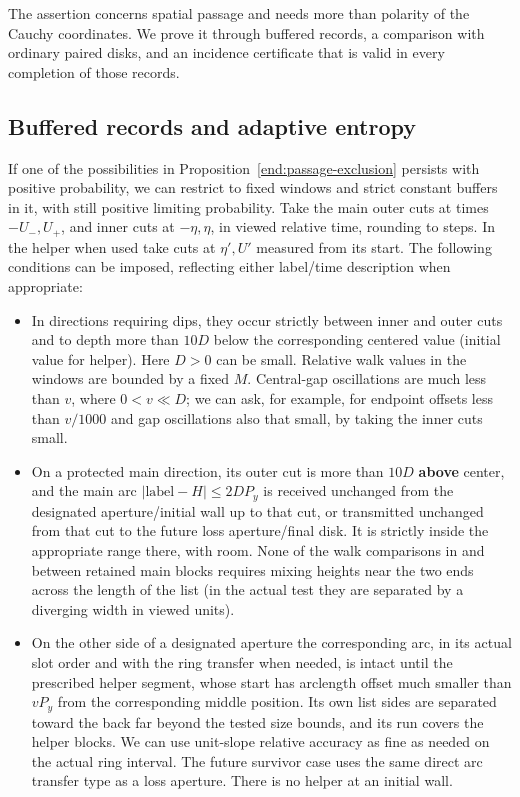 The assertion concerns spatial passage and needs more than polarity of the
Cauchy coordinates. We prove it through buffered records, a comparison with
ordinary paired disks, and an incidence certificate that is valid in every
completion of those records.

\subsection{Buffered records and adaptive entropy}

If one of the possibilities in Proposition~\ref{end:passage-exclusion}
persists with positive probability, we can restrict to fixed windows and strict constant
buffers in it, with still positive limiting probability. Take the main outer cuts at times
\(-U_-,U_+\), and inner cuts at \(-\eta,\eta\), in viewed relative time, rounding to
steps. In the helper when used take cuts at \(\eta',U'\) measured from its start. The
following conditions can be imposed, reflecting either label/time description when
appropriate:

\begin{itemize}
\item
  In directions requiring dips, they occur strictly between inner and outer cuts and to
  depth more than \(10D\) below the corresponding centered value (initial value for
  helper). Here \(D>0\) can be small. Relative walk values in the windows are bounded by a
  fixed \(M\). Central-gap oscillations are much less than \(v\), where \(0<v\ll D\); we
  can ask, for example, for endpoint offsets less than \(v/1000\) and gap oscillations
  also that small, by taking the inner cuts small.
\item
  On a protected main direction, its outer cut is more than \(10D\) \textbf{above} center,
  and the main arc \(|\text{label}-H|\le 2D P_y\) is received unchanged from the
  designated aperture/initial wall up to that cut, or transmitted unchanged from that cut
  to the future loss aperture/final disk. It is strictly inside the appropriate range
  there, with room. None of the walk comparisons in and between retained main blocks
  requires mixing heights near the two ends across the length of the list (in the actual
  test they are separated by a diverging width in viewed units).
\item
  On the other side of a designated aperture the corresponding arc, in its actual slot
  order and with the ring transfer when needed, is intact until the prescribed helper
  segment, whose start has arclength offset much smaller than \(vP_y\) from the
  corresponding middle position. Its own list sides are separated toward the back far
  beyond the tested size bounds, and its run covers the helper blocks. We can use
  unit-slope relative accuracy as fine as needed on the actual ring interval. The future
  survivor case uses the same direct arc transfer type as a loss aperture. There is no
  helper at an initial wall.
\end{itemize}

